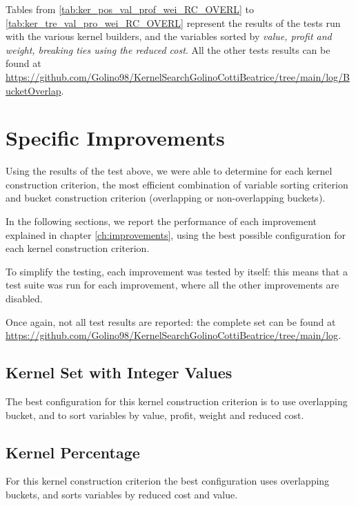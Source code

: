 Tables from \ref{tab:ker_pos_val_prof_wei_RC_OVERL} to \ref{tab:ker_tre_val_pro_wei_RC_OVERL} represent the results of the tests run with the various kernel builders, and the variables sorted by \textit{value, profit and weight, breaking ties using the reduced cost}.
All the other tests results can be found at \url{https://github.com/Golino98/KernelSearchGolinoCottiBeatrice/tree/main/log/BucketOverlap}.






\section{Specific Improvements}
Using the results of the test above, we were able to determine
for each kernel construction criterion, the most efficient combination of variable sorting criterion and bucket construction criterion (overlapping or non-overlapping buckets).

In the following sections, we report the performance of each improvement explained in chapter \ref{ch:improvements}, using the best possible configuration for each kernel construction criterion.

To simplify the testing, each improvement was tested by itself: this means that a test suite was run for each improvement, where all the other improvements are disabled.

Once again, not all test results are reported: the complete set can be found at \url{https://github.com/Golino98/KernelSearchGolinoCottiBeatrice/tree/main/log}.

\subsection{Kernel Set with Integer Values}
The best configuration for this kernel construction criterion is to use overlapping bucket, and to sort variables by value, profit, weight and reduced cost.

\subsection{Kernel Percentage}
For this kernel construction criterion the best configuration uses overlapping buckets, and sorts variables by reduced cost and value. 

